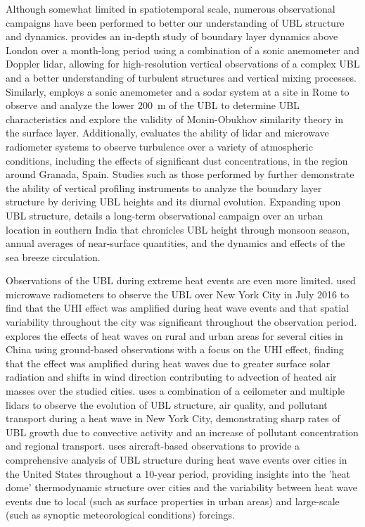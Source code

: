 \documentclass[11pt,a4paper]{article}
\begin{document}
Although somewhat limited in spatiotemporal scale, numerous observational campaigns have been performed to better our understanding of UBL structure and dynamics. \citet{barlow2011} provides an in-depth study of boundary layer dynamics above London over a month-long period using a combination of a sonic anemometer and Doppler lidar, allowing for high-resolution vertical observations of a complex UBL and a better understanding of turbulent structures and vertical mixing processes. Similarly, \citet{pelliccioni2012} employs a sonic anemometer and a sodar system at a site in Rome to observe and analyze the lower \SI{200}{\meter} of the UBL to determine UBL characteristics and explore the validity of Monin-Obukhov similarity theory in the surface layer. Additionally, \citet{dearrudamoreira2020} evaluates the ability of lidar and microwave radiometer systems to observe turbulence over a variety of atmospheric conditions, including the effects of significant dust concentrations, in the region around Granada, Spain. Studies such as those performed by \citet{banks2015, quan2013, wang2012} further demonstrate the ability of vertical profiling instruments to analyze the boundary layer structure by deriving UBL heights and its diurnal evolution. Expanding upon UBL structure, \citet{anurose2018} details a long-term observational campaign over an urban location in southern India that chronicles UBL height through monsoon season, annual averages of near-surface quantities, and the dynamics and effects of the sea breeze circulation. 

Observations of the UBL during extreme heat events are even more limited. \citet{ramamurthy2017a} used microwave radiometers to observe the UBL over New York City in July 2016 to find that the UHI effect was amplified during heat wave events and that spatial variability throughout the city was significant throughout the observation period. \citet{jiang2019} explores the effects of heat waves on rural and urban areas for several cities in China using ground-based observations with a focus on the UHI effect, finding that the effect was amplified during heat waves due to greater surface solar radiation and shifts in wind direction contributing to advection of heated air masses over the studied cities. \citep{wu2019} uses a combination of a ceilometer and multiple lidars to observe the evolution of UBL structure, air quality, and pollutant transport during a heat wave in New York City, demonstrating sharp rates of UBL growth due to convective activity and an increase of pollutant concentration and regional transport. \citet{zhang2020} uses aircraft-based observations to provide a comprehensive analysis of UBL structure during heat wave events over cities in the United States throughout a 10-year period, providing insights into the 'heat dome' thermodynamic structure over cities and the variability between heat wave events due to local (such as surface properties in urban areas) and large-scale (such as synoptic meteorological conditions) forcings. 
\end{document}

